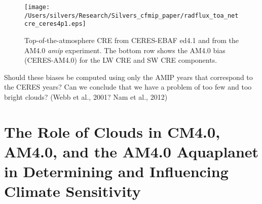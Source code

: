 \documentclass[draft]{agujournal2019}
\begin{document}
\begin{figure}
  \centering
  \texttt{[image: /Users/silvers/Research/Silvers\_cfmip\_paper/radflux\_toa\_netcre\_ceres4p1.eps]}
  \caption{Top-of-the-atmosphere CRE from CERES-EBAF ed4.1 and from the AM4.0 \textit{amip} experiment.  
  The bottom row shows the AM4.0 bias (CERES-AM4.0) for the LW CRE and SW CRE components.}
  \label{fig:ceres_cre_4p1}
\end{figure}

Should these biases be computed using only the AMIP years that 
correspond to the CERES years? 
Can we conclude that we have a problem of too few and too bright clouds?   (Webb et al., 2001? Nam et al., 2012)



\section{The Role of Clouds in CM4.0, AM4.0, and the AM4.0 Aquaplanet in Determining and Influencing Climate Sensitivity}


\end{document}
